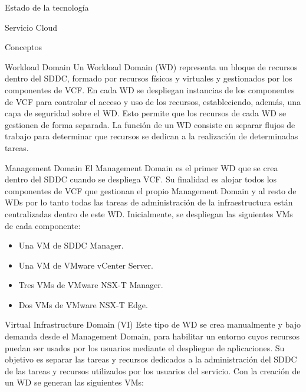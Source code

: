 \begin{chapter}{Estado de la tecnología}
\begin{section}{Servicio Cloud}
\begin{subsection}{Conceptos}
        
        \begin{subsubsection}{Workload Domain}
        Un Workload Domain (WD) representa un bloque de recursos dentro del SDDC, formado por recursos físicos y virtuales y gestionados por los componentes de VCF. En cada WD se despliegan instancias de los componentes de VCF para controlar el acceso y uso de los recursos, estableciendo, además, una capa de seguridad sobre el WD. Esto permite que los recursos de cada WD se gestionen de forma separada. La función de un WD consiste en separar flujos de trabajo para determinar que recursos se dedican a la realización de determinadas tareas.
        \end{subsubsection}
        \begin{subsubsection}{Management Domain}
        \label{subsubsec:domainManagement}
        El Management Domain es el primer WD que se crea dentro del SDDC cuando se despliega VCF. Su finalidad es alojar todos los componentes de VCF que gestionan el propio Management Domain y al resto de WDs por lo tanto todas las tareas de administración de la infraestructura están centralizadas dentro de este WD. Inicialmente, se despliegan las siguientes VMs de cada componente:
        \begin{itemize}
          \item Una VM de SDDC Manager.
          \item Una VM de VMware vCenter Server.
          \item Tres VMs de VMware NSX-T Manager.
          \item Dos VMs de VMware NSX-T Edge.
        \end{itemize}
        \end{subsubsection}        
        \begin{subsubsection}{Virtual Infrastructure Domain (VI)}
        \label{subsubsec:domainVI}
        Este tipo de WD se crea manualmente y bajo demanda desde el Management Domain, para habilitar un entorno cuyos recursos puedan ser usados por los usuarios mediante el despliegue de aplicaciones. Su objetivo es separar las tareas y recursos dedicados a la administración del SDDC de las tareas y recursos utilizados por los usuarios del servicio. Con la creación de un WD se generan las siguientes VMs:

\end{subsubsection}
\end{subsection}
\end{section}
\end{chapter}
